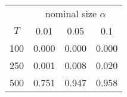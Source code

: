 % 
\begin{tabular}{cccc}
  \hline
  & \multicolumn{3}{c}{nominal size $\alpha$} \\
 $T$ & 0.01 & 0.05 & 0.1 \\
 \hline
100 & 0.000 & 0.000 & 0.000 \\ 
  250 & 0.001 & 0.008 & 0.020 \\ 
  500 & 0.751 & 0.947 & 0.958 \\ 
   \hline
\end{tabular}
